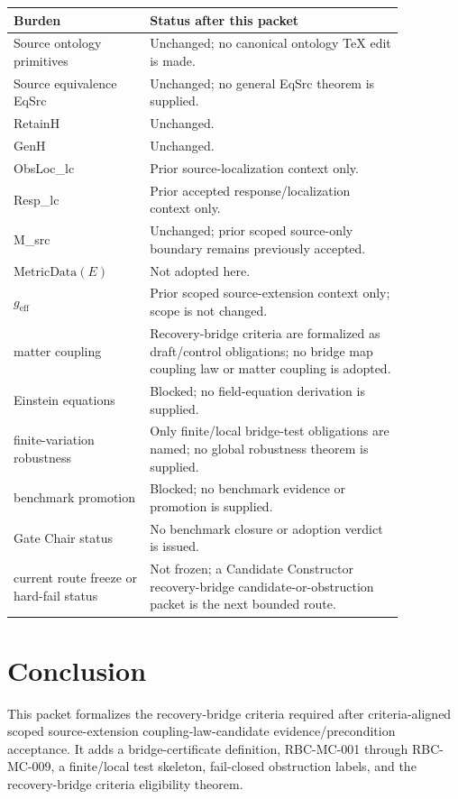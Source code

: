 \documentclass[11pt]{article}
\newcommand{\MetricData}{\mathrm{MetricData}}
\newcommand{\geff}{g_{\mathrm{eff}}}
\begin{document}
\begin{longtable}{p{0.30\linewidth}p{0.56\linewidth}}
\toprule
Burden & Status after this packet \\
\midrule
Source ontology primitives & Unchanged; no canonical ontology TeX edit is made. \\
Source equivalence EqSrc & Unchanged; no general EqSrc theorem is supplied. \\
RetainH & Unchanged. \\
GenH & Unchanged. \\
ObsLoc\_lc & Prior source-localization context only. \\
Resp\_lc & Prior accepted response/localization context only. \\
M\_src & Unchanged; prior scoped source-only boundary remains previously accepted. \\
\(\MetricData(E)\) & Not adopted here. \\
\(\geff\) & Prior scoped source-extension context only; scope is not changed. \\
matter coupling & Recovery-bridge criteria are formalized as draft/control obligations; no bridge map coupling law or matter coupling is adopted. \\
Einstein equations & Blocked; no field-equation derivation is supplied. \\
finite-variation robustness & Only finite/local bridge-test obligations are named; no global robustness theorem is supplied. \\
benchmark promotion & Blocked; no benchmark evidence or promotion is supplied. \\
Gate Chair status & No benchmark closure or adoption verdict is issued. \\
current route freeze or hard-fail status & Not frozen; a Candidate Constructor recovery-bridge candidate-or-obstruction packet is the next bounded route. \\
\bottomrule
\end{longtable}

\section{Conclusion}

This packet formalizes the recovery-bridge criteria required after
criteria-aligned scoped source-extension coupling-law-candidate
evidence/precondition acceptance. It adds a bridge-certificate definition,
RBC-MC-001 through RBC-MC-009, a finite/local test skeleton, fail-closed
obstruction labels, and the recovery-bridge criteria eligibility theorem.
\end{document}
